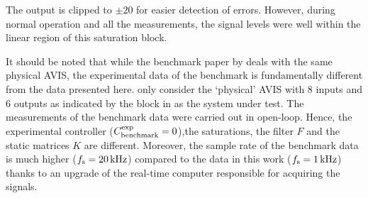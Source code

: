 The output  is clipped to $\pm 20$ for easier detection of errors.
However, during normal operation and all the measurements, the signal levels were well within the linear region of this saturation block.

\begin{remark}
It should be noted that while the benchmark paper by \citet{Voorhoeve2015SYSID} deals with the same physical \gls{AVIS}, the experimental data of the benchmark is fundamentally different from the data presented here.
 only consider the `physical' \gls{AVIS} with $8$ inputs and $6$ outputs as indicated by the  block in  as the system under test.
The measurements of the benchmark data were carried out in open-loop.
Hence, the experimental controller ($C^{\mathrm{exp}}_{\mathrm{benchmark}} = 0$),the saturations, the filter $F$ and the static matrices $K$ are different.
Moreover, the sample rate of the benchmark data is much higher ($f_{\mathrm{s}}  = 20 \,\mathrm{kHz}$) compared to the data in this work ($f_{\mathrm{s}} = 1\,\mathrm{kHz}$) thanks to an upgrade of the real-time computer responsible for acquiring the signals.
\end{remark}

